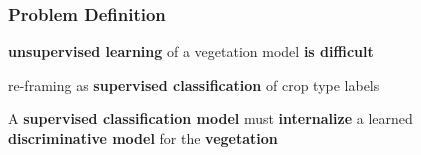 \documentclass[%
  aspectratio=169,
  9pt,
  USenglish,
  titlegraphic, %
  affiliationintitlepagehead,
  progressbar,
]{beamer}
\begin{document}
\begin{frame}
\frametitle{Problem Definition}
\Large


\centering{}

\vspace{1em}
\raggedright

\begin{description}\setlength\itemsep{1em}
\item[\color{tumblue}Problem:]<1-> \textbf{unsupervised learning} of a vegetation model \textbf{is difficult}
\item[\color{tumblue}Solution:]<2-> re-framing as \textbf{supervised classification} of crop type labels
\item[\color{tumblue}Intuition:]<3-> A \textbf{supervised classification model} must \textbf{internalize} a learned \textbf{discriminative model} for the \textbf{vegetation}
\end{description}

\end{frame}


\end{document}
